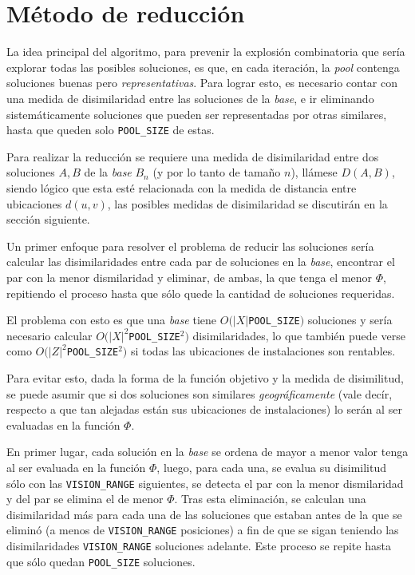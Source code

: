 \section{Método de reducción}


La idea principal del algoritmo, para prevenir la explosión combinatoria que sería explorar todas las posibles soluciones, es que, en cada iteración, la \emph{pool} contenga soluciones buenas pero \emph{representativas}. Para lograr esto, es necesario contar con una medida de disimilaridad entre las soluciones de la \emph{base}, e ir eliminando sistemáticamente soluciones que pueden ser representadas por otras similares, hasta que queden solo \texttt{POOL\_SIZE} de estas.

Para realizar la reducción se requiere una medida de disimilaridad entre dos soluciones $A,B$ de la \emph{base} $B_n$ (y por lo tanto de tamaño $n$), llámese $D(A,B)$, siendo lógico que esta esté relacionada con la medida de distancia entre ubicaciones $d(u,v)$, las posibles medidas de disimilaridad se discutirán en la sección siguiente.

Un primer enfoque para resolver el problema de reducir las soluciones sería calcular las disimilaridades entre cada par de soluciones en la \emph{base}, encontrar el par con la menor dismilaridad y eliminar, de ambas, la que tenga el menor $\Phi$, repitiendo el proceso hasta que sólo quede la cantidad de soluciones requeridas.

El problema con esto es que una \emph{base} tiene $O(|X|$\texttt{POOL\_SIZE}$)$ soluciones y sería necesario calcular $O({|X|}^2$\texttt{POOL\_SIZE}$^2)$ disimilaridades, lo que también puede verse como $O({|Z|}^2$\texttt{POOL\_SIZE}$^2)$ si todas las ubicaciones de instalaciones son rentables.

Para evitar esto, dada la forma de la función objetivo y la medida de disimilitud, se puede asumir que si dos soluciones son similares \emph{geográficamente} (vale decír, respecto a que tan alejadas están sus ubicaciones de instalaciones) lo serán al ser evaluadas en la función $\Phi$.

En primer lugar, cada solución en la \emph{base} se ordena de mayor a menor valor tenga al ser evaluada en la función $\Phi$, luego, para cada una, se evalua su disimilitud sólo con las \texttt{VISION\_RANGE} siguientes, se detecta el par con la menor dismilaridad y del par se elimina el de menor $\Phi$. Tras esta eliminación, se calculan una disimilaridad más para cada una de las soluciones que estaban antes de la que se eliminó (a menos de \texttt{VISION\_RANGE} posiciones) a fin de que se sigan teniendo las disimilaridades \texttt{VISION\_RANGE} soluciones adelante. Este proceso se repite hasta que sólo quedan \texttt{POOL\_SIZE} soluciones.


